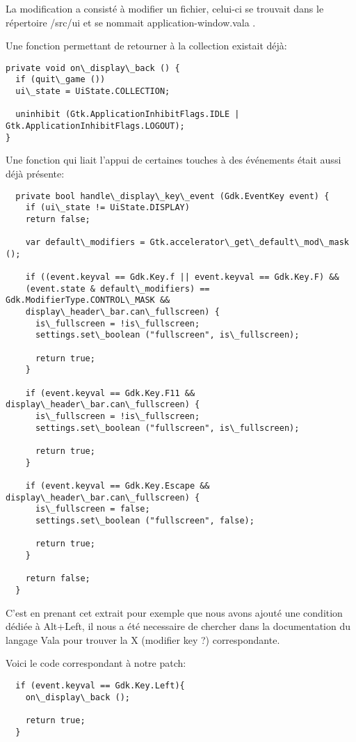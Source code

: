 \documentclass[12pt]{report}
\begin{document}
La modification a consisté à modifier un fichier, celui-ci se trouvait
dans le répertoire /src/ui et se nommait application-window.vala .

Une fonction permettant de retourner à la collection existait déjà:

\begin{verbatim}
private void on\_display\_back () {
  if (quit\_game ())
  ui\_state = UiState.COLLECTION;

  uninhibit (Gtk.ApplicationInhibitFlags.IDLE | Gtk.ApplicationInhibitFlags.LOGOUT);
}
\end{verbatim}

Une fonction qui liait l'appui de certaines touches à des événements
était aussi déjà présente:

\begin{verbatim}
  private bool handle\_display\_key\_event (Gdk.EventKey event) {
    if (ui\_state != UiState.DISPLAY)
    return false;

    var default\_modifiers = Gtk.accelerator\_get\_default\_mod\_mask ();

    if ((event.keyval == Gdk.Key.f || event.keyval == Gdk.Key.F) &&
    (event.state & default\_modifiers) == Gdk.ModifierType.CONTROL\_MASK &&
    display\_header\_bar.can\_fullscreen) {
      is\_fullscreen = !is\_fullscreen;
      settings.set\_boolean ("fullscreen", is\_fullscreen);

      return true;
    }

    if (event.keyval == Gdk.Key.F11 && display\_header\_bar.can\_fullscreen) {
      is\_fullscreen = !is\_fullscreen;
      settings.set\_boolean ("fullscreen", is\_fullscreen);

      return true;
    }

    if (event.keyval == Gdk.Key.Escape && display\_header\_bar.can\_fullscreen) {
      is\_fullscreen = false;
      settings.set\_boolean ("fullscreen", false);

      return true;
    }
    
    return false;
  }
\end{verbatim}

C'est en prenant cet extrait pour exemple que nous avons ajouté une
condition dédiée à Alt+Left, il nous a été necessaire de chercher dans
la documentation du langage Vala pour trouver la X (modifier key ?)
correspondante.

Voici le code correspondant à notre patch:

\begin{verbatim}
  if (event.keyval == Gdk.Key.Left){			
    on\_display\_back ();
    
    return true;
  }
\end{verbatim}
\end{document}
